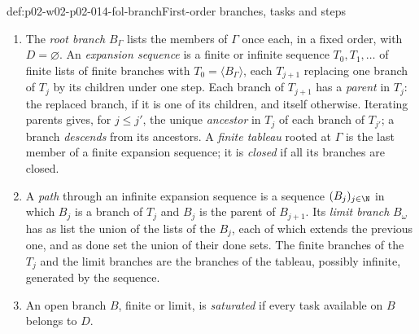 \begin{hbdefinition}{def:p02-w02-p02-014-fol-branch}{First-order branches, tasks and steps}
\begin{enumerate}
        \(\langle i,t\rangle\) with \(\theta_i=\forall x\,\varphi\) or
        \(\neg\exists x\,\varphi\), the single alternative
        \(\langle\varphi[t/x]\rangle\) or \(\langle\neg(\varphi[t/x])\rangle\).
        For \(\langle{=},t\rangle\), \(\langle t=t\rangle\); for
        \(\langle i,j,\varphi\rangle\) with \(\theta_i\) the equation \(r=u\),
        \(\langle\varphi[u/x_0]\rangle\).
  \item The \emph{root branch} \(B_\Gamma\) lists the members of \(\Gamma\) once
        each, in a fixed order, with \(D=\varnothing\).  An \emph{expansion
        sequence} is a finite or infinite sequence \(T_0,T_1,\ldots\) of
        finite lists of finite branches with \(T_0=\langle B_\Gamma\rangle\),
        each \(T_{j+1}\) replacing one branch of \(T_j\) by its children under
        one step.  Each branch of \(T_{j+1}\) has a \emph{parent} in \(T_j\):
        the replaced branch, if it is one of its children, and itself
        otherwise.  Iterating parents gives, for \(j\leq j'\), the unique
        \emph{ancestor} in \(T_j\) of each branch of \(T_{j'}\); a branch
        \emph{descends} from its ancestors.  A \emph{finite tableau} rooted at
        \(\Gamma\) is the last member of a finite expansion sequence; it is
        \emph{closed} if all its branches are closed.
  \item A \emph{path} through an infinite expansion sequence is a sequence
        \((B_j)_{j\in\N}\) in which \(B_j\) is a branch of \(T_j\) and
        \(B_j\) is the parent of \(B_{j+1}\).  Its \emph{limit branch}
        \(B_\omega\) has as list the union of the lists of the \(B_j\), each
        of which extends the previous one, and as done set the union of
        their done sets.  The finite branches of the \(T_j\) and the limit
        branches are the branches of the tableau, possibly infinite,
        generated by the sequence.
  \item An open branch \(B\), finite or limit, is \emph{saturated} if every
        task available on \(B\) belongs to \(D\).
\end{enumerate}
\end{hbdefinition}

